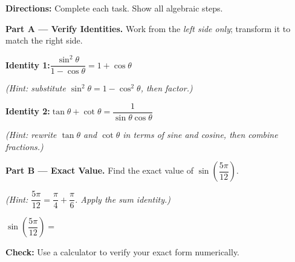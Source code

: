 \documentclass[10pt]{article}
\begin{document}
\begin{tcolorbox}[colback=white, colframe=black!40,
    title=\textbf{Tier E --- Extend},
    fonttitle=\bfseries, arc=2mm, left=3mm, right=3mm, top=2mm, bottom=2mm]

\textbf{Directions:} Complete each task. Show all algebraic steps.

\vspace{8pt}
\textbf{Part A --- Verify Identities.} Work from the \emph{left side only}; transform it
to match the right side.

\vspace{4pt}
\textbf{Identity 1:}\quad $\dfrac{\sin^2\theta}{1 - \cos\theta} = 1 + \cos\theta$

\vspace{4pt}
\textit{(Hint: substitute $\sin^2\theta = 1 - \cos^2\theta$, then factor.)}


\vspace{4pt}
\textbf{Identity 2:}\quad $\tan\theta + \cot\theta = \dfrac{1}{\sin\theta\cos\theta}$

\vspace{4pt}
\textit{(Hint: rewrite $\tan\theta$ and $\cot\theta$ in terms of sine and cosine, then combine fractions.)}


\vspace{8pt}
\textbf{Part B --- Exact Value.} Find the exact value of $\sin\!\left(\dfrac{5\pi}{12}\right)$.

\textit{(Hint: $\dfrac{5\pi}{12} = \dfrac{\pi}{4} + \dfrac{\pi}{6}$. Apply the sum identity.)}


$\sin\!\left(\dfrac{5\pi}{12}\right) = $ \underline{\hspace{4cm}}

\vspace{4pt}
\textbf{Check:} Use a calculator to verify your exact form numerically.

\end{tcolorbox}
\end{document}
